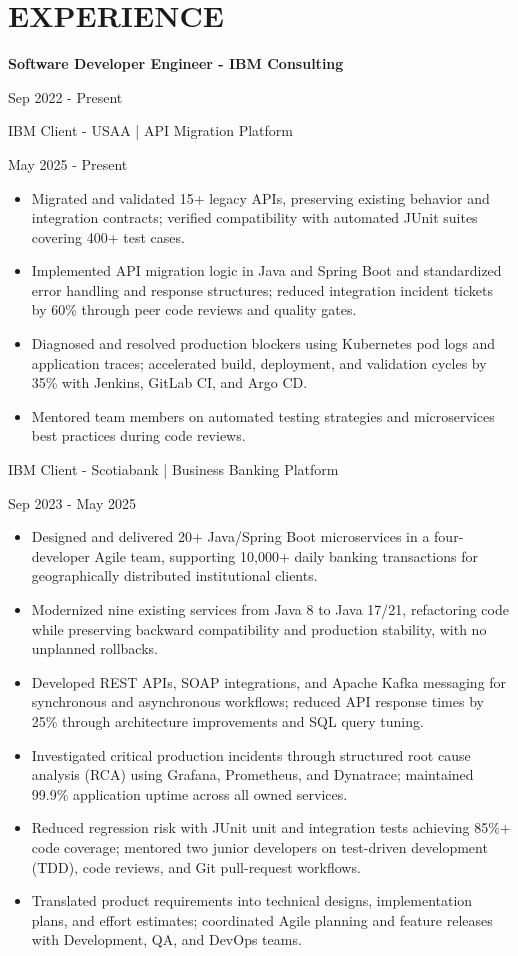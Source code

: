 \documentclass[10pt,a4paper]{article}
\newlength{\rolefontsize}
\newlength{\clientfontsize}
\newlength{\singlelinespacing}
\newlength{\singleseparation}
\newcommand{\role}[1]{
  \vspace{\singleseparation}
  {\fontsize{\rolefontsize}{\singlelinespacing} \selectfont \bfseries #1 \par}
  \nopagebreak}
\newcommand{\client}[1]{
  \vspace{\singleseparation}
  {\fontsize{\clientfontsize}{\singlelinespacing} \selectfont #1 \par} 
  \nopagebreak}
\begin{document}
\section*{EXPERIENCE}
\role{Software Developer Engineer - IBM Consulting}
Sep 2022 - Present \par
\client{IBM Client - USAA | API Migration Platform}
May 2025 - Present \par
\begin{itemize}
  \item Migrated and validated 15+ legacy APIs, preserving existing behavior and integration contracts; verified compatibility with automated JUnit suites covering 400+ test cases.
  \item Implemented API migration logic in Java and Spring Boot and standardized error handling and response structures; reduced integration incident tickets by 60\% through peer code reviews and quality gates.
  \item Diagnosed and resolved production blockers using Kubernetes pod logs and application traces; accelerated build, deployment, and validation cycles by 35\% with Jenkins, GitLab CI, and Argo CD.
  \item Mentored team members on automated testing strategies and microservices best practices during code reviews.
\end{itemize}
\client{IBM Client - Scotiabank | Business Banking Platform}
Sep 2023 - May 2025 \par
\begin{itemize}
  \item Designed and delivered 20+ Java/Spring Boot microservices in a four-developer Agile team, supporting 10,000+ daily banking transactions for geographically distributed institutional clients.
  \item Modernized nine existing services from Java 8 to Java 17/21, refactoring code while preserving backward compatibility and production stability, with no unplanned rollbacks.
  \item Developed REST APIs, SOAP integrations, and Apache Kafka messaging for synchronous and asynchronous workflows; reduced API response times by 25\% through architecture improvements and SQL query tuning.
  \item Investigated critical production incidents through structured root cause analysis (RCA) using Grafana, Prometheus, and Dynatrace; maintained 99.9\% application uptime across all owned services.
  \item Reduced regression risk with JUnit unit and integration tests achieving 85\%+ code coverage; mentored two junior developers on test-driven development (TDD), code reviews, and Git pull-request workflows.
  \item Translated product requirements into technical designs, implementation plans, and effort estimates; coordinated Agile planning and feature releases with Development, QA, and DevOps teams.
\end{itemize}
\end{document}
